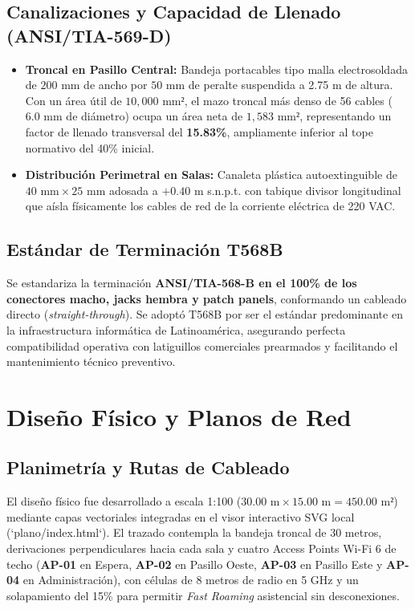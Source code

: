 \documentclass[11pt,a4paper]{article}
\begin{document}
\subsection{Canalizaciones y Capacidad de Llenado (ANSI/TIA-569-D)}
\begin{itemize}[noitemsep]
    \item \textbf{Troncal en Pasillo Central:} Bandeja portacables tipo malla electrosoldada de $200\text{ mm}$ de ancho por $50\text{ mm}$ de peralte suspendida a 2.75 m de altura. Con un área útil de $10,000\text{ mm²}$, el mazo troncal más denso de 56 cables ($6.0\text{ mm}$ de diámetro) ocupa un área neta de $1,583\text{ mm²}$, representando un factor de llenado transversal del \textbf{15.83\%}, ampliamente inferior al tope normativo del 40\% inicial.
    \item \textbf{Distribución Perimetral en Salas:} Canaleta plástica autoextinguible de $40\text{ mm} \times 25\text{ mm}$ adosada a $+0.40\text{ m}$ s.n.p.t. con tabique divisor longitudinal que aísla físicamente los cables de red de la corriente eléctrica de 220 VAC.
\end{itemize}

\subsection{Estándar de Terminación T568B}
Se estandariza la terminación \textbf{ANSI/TIA-568-B en el 100\% de los conectores macho, jacks hembra y patch panels}, conformando un cableado directo (\textit{straight-through}). Se adoptó T568B por ser el estándar predominante en la infraestructura informática de Latinoamérica, asegurando perfecta compatibilidad operativa con latiguillos comerciales prearmados y facilitando el mantenimiento técnico preventivo.

\section{Diseño Físico y Planos de Red}

\subsection{Planimetría y Rutas de Cableado}
El diseño físico fue desarrollado a escala 1:100 ($30.00\text{ m} \times 15.00\text{ m} = 450.00\text{ m²}$) mediante capas vectoriales integradas en el visor interactivo SVG local (`plano/index.html`). El trazado contempla la bandeja troncal de 30 metros, derivaciones perpendiculares hacia cada sala y cuatro Access Points Wi-Fi 6 de techo (\textbf{AP-01} en Espera, \textbf{AP-02} en Pasillo Oeste, \textbf{AP-03} en Pasillo Este y \textbf{AP-04} en Administración), con células de 8 metros de radio en 5 GHz y un solapamiento del 15\% para permitir \textit{Fast Roaming} asistencial sin desconexiones.
\end{document}

